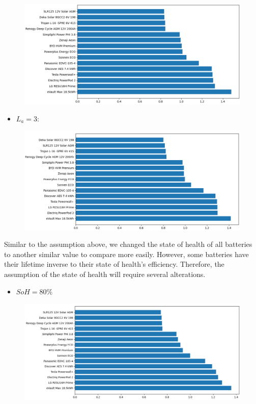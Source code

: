 \begin{figure}[H]
\centering
\includegraphics[scale=0.4]{src/5.png}
\end{figure}
\begin{itemize}
    \item $L_a = 3:$
\end{itemize}
\begin{figure}[H]
\centering
\includegraphics[scale=0.4]{src/6.png}
\end{figure}
Similar to the assumption above, we changed the state of health of all batteries to another similar value to compare more easily. However, some batteries have their lifetime inverse to their state of health's efficiency. Therefore, the assumption of the state of health will require several alterations.
\begin{itemize}
    \item $SoH = 80\%$
\end{itemize}
\begin{figure}[H]
\centering
\includegraphics[scale=0.4]{src/7.png}
\end{figure}
